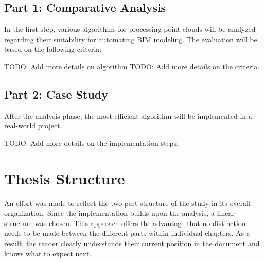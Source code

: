 \subsection{Part 1: Comparative Analysis}
\begin{comment}
Im ersten Schritt werden verschiedene Algorithmen zur Verarbeitung von Punktwolken hinsichtlich ihrer Eignung für die Automatisierung der BIM-Modellierung untersucht. Die Bewertung erfolgt anhand folgender Kriterien:
\end{comment}
In the first step, various algorithms for processing point clouds will be analyzed regarding their suitability for automating BIM modeling. The evaluation will be based on the following criteria:

TODO: Add more details on algorithm
TODO: Add more details on the criteria.

\subsection{Part 2: Case Study}
\begin{comment}
Nach der Analysephase wird der leistungsfähigste Algorithmus in einem realen Projekt implementiert.
\end{comment}
After the analysis phase, the most efficient algorithm will be implemented in a real-world project. 

TODO: Add more details on the implementation steps.


\section{Thesis Structure}
\begin{comment}
es wurde versucht, die zweiteilung der arbeit auch in der struktur wiederzuspiegeln. da die implementierung auf der analyse aufbaut, bietet sich ein linearer aufbau an. dies bringt den den vorteil, dass innerhalb der kapitel nicht zwischen den unterschiedlichen teilen unterschieden werden muss. der leser weiss dadurch klar, wo er sich befindet und was er erwarten darf.
\end{comment}
An effort was made to reflect the two-part structure of the study in its overall organization. Since the implementation builds upon the analysis, a linear structure was chosen. This approach offers the advantage that no distinction needs to be made between the different parts within individual chapters. As a result, the reader clearly understands their current position in the document and knows what to expect next. 

